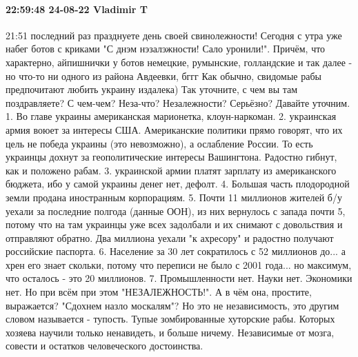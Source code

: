 \paragraph{22:59:48 24-08-22 Vladimir T}

21:51
последний раз празднуете день своей свинолежности!
Сегодня с утра уже набег ботов с криками "С днэм нэзалэжности! Сало уронили!".
Причём, что характерно, айпишнички у ботов немецкие, румынские, голландские и так далее - но что-то ни одного из района Авдеевки, бггг
Как обычно, свидомые рабы предпочитают любить украину издалека)
Так уточните, с чем вы там поздравляете? С чем-чем? Неза-что?
Незалежности?
Серьёзно?
Давайте уточним.
1. Во главе украины американская марионетка, клоун-наркоман.
2. украинская армия воюет за интересы США. Американские политики прямо говорят, что их цель не победа украины (это невозможно), а ослабление России. То есть украинцы дохнут за геополитические интересы Вашингтона. Радостно гибнут, как и положено рабам.
3. украинской армии платят зарплату из американского бюджета, ибо у самой украины денег нет, дефолт.
4. Большая часть плодородной земли продана иностранным корпорациям.
5. Почти 11 миллионов жителей б/у уехали за последние полгода (данные ООН), из них вернулось с запада почти 5, потому что на там украинцы уже всех задолбали и их снимают с довольствия и отправляют обратно. Два миллиона уехали "к ахресору" и радостно получают российские паспорта.
6. Население за 30 лет сократилось с 52 миллионов до... а хрен его знает скольки, потому что переписи не было с 2001 года... но максимум, что осталось - это 20 миллионов.
7. Промышленности нет. Науки нет. Экономики нет.
Но при всём при этом "НЕЗАЛЕЖНОСТЬ!".
А в чём она, простите, выражается?
"Сдохнем назло москалям"? Но это не независимость, это другим словом называется - тупость.
Тупые зомбированные хуторские рабы. Которых хозяева научили только ненавидеть, и больше ничему.
Независимые от мозга, совести и остатков человеческого достоинства.
